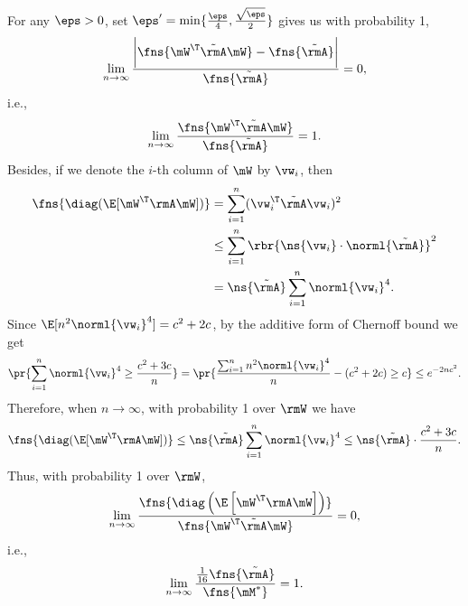 \begin{proofof}{}
\begin{proofof}{}
For any $\eps>0$, set $\eps'=\min\{\frac{\eps}{4},\frac{\sqrt{\eps}}{2}\}$ gives us with probability 1,
\begin{equation}
    \lim_{n\to\infty}\frac{\bigg|\fns{\mW^\T\tilde{\rmA}\mW} - \fns{\tilde{\rmA}}\bigg|}{\fns{\tilde{\rmA}}}=0,
\end{equation}
i.e.,
\begin{equation}
    \lim_{n\to\infty}\frac{\fns{\mW^\T\tilde{\rmA}\mW}}{\fns{\tilde{\rmA}}}=1.
\end{equation}
Besides, if we denote the $i$-th column of $\mW$ by $\vw_i$, then
\begin{equation}
\begin{split}
\fns{\diag(\E[\mW^\T\rmA\mW])} &= \sum_{i=1}^n (\vw_i^\T\tilde{\rmA}\vw_i)^2\\
&\leq \sum_{i=1}^n \rbr{\ns{\vw_i}\cdot\norml{\tilde{\rmA}}}^2\\
&= \ns{\tilde{\rmA}}\sum_{i=1}^n \norml{\vw_i}^4.
\end{split}
\end{equation}
Since $\E[n^2\norml{\vw_i}^4]=c^2+2c$, by the additive form of Chernoff bound we get
\begin{equation}
\pr{\sum_{i=1}^n\norml{\vw_i}^4\geq \frac{c^2+3c}{n}}=\pr{\frac{\sum_{i=1}^nn^2\norml{\vw_i}^4}{n}-(c^2+2c)\geq c}\leq e^{-2nc^2}.
\end{equation}
Therefore, when $n\to\infty$, with probability 1 over $\rmW$ we have
\begin{equation}
\fns{\diag(\E[\mW^\T\rmA\mW])}\leq \ns{\tilde{\rmA}}\sum_{i=1}^n \norml{\vw_i}^4\leq \ns{\tilde{\rmA}}\cdot\frac{c^2+3c}{n}.
\end{equation}
Thus, with probability 1 over $\rmW$,
\begin{equation}
\label{lemma:W-diag-neg}
\lim_{n\to\infty}\frac{\fns{\diag\left(\E\left[\mW^\T\rmA\mW\right]\right)}}{\fns{\mW^\T\tilde{\rmA}\mW}} = 0,
\end{equation}
i.e.,
\begin{equation}
\lim_{n\to\infty}\frac{\frac{1}{16}\fns{\tilde{\rmA}}}{\fns{\mM^*}} = 1.
\end{equation}


\end{proofof}
\end{proofof}
